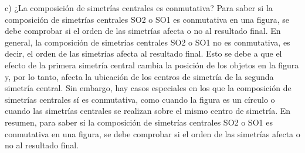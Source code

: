 \documentclass{article}
\begin{document}
c) ¿La composición de simetrías centrales es conmutativa?
Para saber si la composición de simetrías centrales SO2 o SO1 es conmutativa en una figura, se debe comprobar si el orden de las simetrías afecta o no al resultado final.  En general, la composición de simetrías centrales SO2 o SO1 no es conmutativa, es decir, el orden de las simetrías afecta al resultado final. Esto se debe a que el efecto de la primera simetría central cambia la posición de los objetos en la figura y, por lo tanto, afecta la ubicación de los centros de simetría de la segunda simetría central.  Sin embargo, hay casos especiales en los que la composición de simetrías centrales sí es conmutativa, como cuando la figura es un círculo o cuando las simetrías centrales se realizan sobre el mismo centro de simetría.  En resumen, para saber si la composición de simetrías centrales SO2 o SO1 es conmutativa en una figura, se debe comprobar si el orden de las simetrías afecta o no al resultado final.
\end{document}
